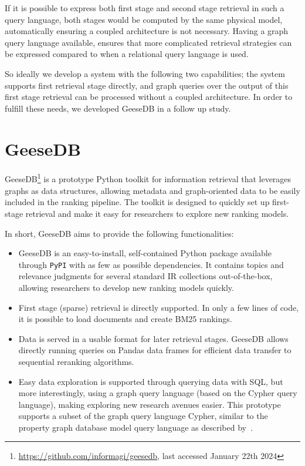 If it is possible to express both first stage and second stage retrieval in such a query language, both stages would be computed by the same physical model, automatically ensuring a coupled architecture is not necessary. Having a graph query language available, ensures that more complicated retrieval strategies can be expressed compared to when a relational query language is used. 

So ideally we develop a system with the following two capabilities; the system supports first retrieval stage directly, and graph queries over the output of this first stage retrieval can be processed without a coupled architecture. In order to fulfill these needs, we developed GeeseDB in a follow up study. 

\section{GeeseDB}
GeeseDB\footnote{\url{https://github.com/informagi/geesedb}, last accessed January 22th 2024} is a prototype Python toolkit for information retrieval that leverages graphs as data structures, allowing metadata and graph-oriented data to be easily included in the ranking pipeline. The toolkit is designed to quickly set up first-stage retrieval and make it easy for researchers to explore new ranking models. 

In short, GeeseDB aims to provide the following functionalities:
\begin{itemize}
	\item GeeseDB is an easy-to-install, self-contained Python package available through \texttt{PyPI} with as few as possible dependencies. It contains topics and relevance judgments for several standard IR collections out-of-the-box, allowing researchers to develop new ranking models quickly. 
	\item First stage (sparse) retrieval is directly supported. In only a few lines of code, it is possible to load documents and create BM25 rankings. 
	\item Data is served in a usable format for later retrieval stages. GeeseDB allows directly running queries on Pandas data frames for efficient data transfer to sequential reranking algorithms.
	\item Easy data exploration is supported through querying data with SQL, but more interestingly, using a graph query language (based on the Cypher query language), making exploring new research avenues easier. This prototype supports a subset of the graph query language Cypher, similar to the property graph database model query language as described by~\citet{angles2018property}.
\end{itemize}

